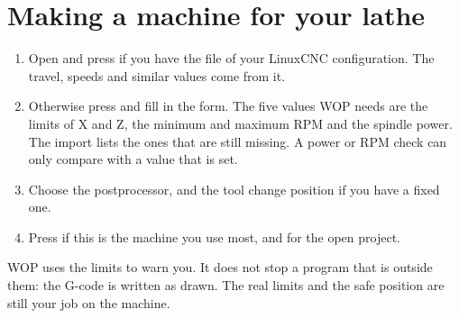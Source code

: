 \section{Making a machine for your lathe}\label{sec:machines:own}
\begin{enumerate}
  \item Open  and press  if you have the  file of your LinuxCNC configuration. The travel, speeds and similar values come from it.
  \item Otherwise press  and fill in the form. The five values WOP needs are the limits of X and Z, the minimum and maximum RPM and the spindle power. The import lists the ones that are still missing. A power or RPM check can only compare with a value that is set.
  \item Choose the postprocessor, and the tool change position if you have a fixed one.
  \item Press  if this is the machine you use most, and  for the open project.
\end{enumerate}

\begin{warningbox}
WOP uses the limits to warn you. It does not stop a program that is outside them: the G-code is written as drawn. The real limits and the safe position are still your job on the machine.
\end{warningbox}
